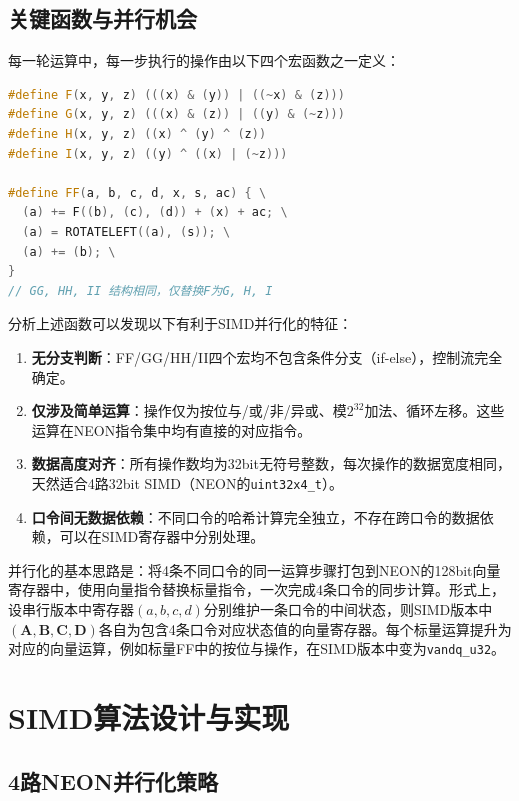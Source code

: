 \documentclass[UTF8,a4paper,10pt]{ctexart}
\begin{document}
\subsection{关键函数与并行机会}

每一轮运算中，每一步执行的操作由以下四个宏函数之一定义：

\begin{lstlisting}[title=串行MD5轮函数宏定义,frame=trbl,language={C++}]
#define F(x, y, z) (((x) & (y)) | ((~x) & (z)))
#define G(x, y, z) (((x) & (z)) | ((y) & (~z)))
#define H(x, y, z) ((x) ^ (y) ^ (z))
#define I(x, y, z) ((y) ^ ((x) | (~z)))

#define FF(a, b, c, d, x, s, ac) { \
  (a) += F((b), (c), (d)) + (x) + ac; \
  (a) = ROTATELEFT((a), (s)); \
  (a) += (b); \
}
// GG, HH, II 结构相同，仅替换F为G, H, I
\end{lstlisting}

分析上述函数可以发现以下有利于SIMD并行化的特征：

\begin{enumerate}
  \item \textbf{无分支判断}：FF/GG/HH/II四个宏均不包含条件分支（if-else），控制流完全确定。
  \item \textbf{仅涉及简单运算}：操作仅为按位与/或/非/异或、模$2^{32}$加法、循环左移。这些运算在NEON指令集中均有直接的对应指令。
  \item \textbf{数据高度对齐}：所有操作数均为32bit无符号整数，每次操作的数据宽度相同，天然适合4路32bit SIMD（NEON的\lstinline{uint32x4_t}）。
  \item \textbf{口令间无数据依赖}：不同口令的哈希计算完全独立，不存在跨口令的数据依赖，可以在SIMD寄存器中分别处理。
\end{enumerate}

并行化的基本思路是：将4条不同口令的同一运算步骤打包到NEON的128bit向量寄存器中，使用向量指令替换标量指令，一次完成4条口令的同步计算。形式上，设串行版本中寄存器$(a,b,c,d)$分别维护一条口令的中间状态，则SIMD版本中$(\mathbf{A},\mathbf{B},\mathbf{C},\mathbf{D})$各自为包含4条口令对应状态值的向量寄存器。每个标量运算提升为对应的向量运算，例如标量FF中的按位与操作，在SIMD版本中变为\lstinline{vandq_u32}。

\section{SIMD算法设计与实现}

\subsection{4路NEON并行化策略}
\end{document}
